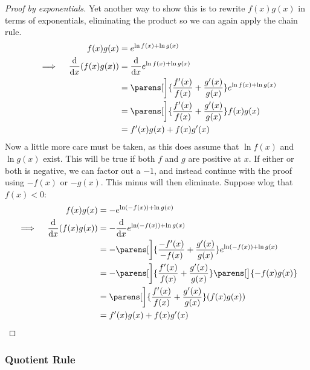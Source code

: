 \begin{proof}[Proof by exponentials]
    Yet another way to show this is to rewrite \(f(x)g(x)\) in terms of
    exponentials, eliminating the product so we can again apply the chain rule.
    \begin{alignat*}{2}
        && f(x)g(x) &= e^{\ln f(x) + \ln g(x)} \\
        &\implies{}& \dv{x} (f(x)g(x))
                    &= \dv{x} e^{\ln f(x) + \ln g(x)} \\
        &&          &= \parens[\bigg]{\frac{f'(x)}{f(x)} + \frac{g'(x)}{g(x)}}
                         e^{\ln f(x) + \ln g(x)} \\
        &&          &= \parens[\bigg]{\frac{f'(x)}{f(x)} + \frac{g'(x)}{g(x)}}
                         f(x)g(x) \\
        &&          &= f'(x)g(x) + f(x)g'(x)
    \end{alignat*}
    Now a little more care must be taken, as this does assume that \(\ln f(x)\)
    and \(\ln g(x)\) exist. This will be true if both \(f\) and \(g\) are
    positive at \(x\). If either or both is negative, we can factor out a
    \(-1\), and instead continue with the proof using \(-f(x)\) or \(-g(x)\).
    This minus will then eliminate. Suppose wlog that \(f(x) < 0\):
    \begin{alignat*}{2}
        && f(x)g(x) &= -e^{\ln(-f(x)) + \ln g(x)} \\
        &\implies{}& \dv{x} (f(x)g(x))
                    &= -\dv{x} e^{\ln(-f(x)) + \ln g(x)} \\
        &&          &= -\parens[\bigg]{\frac{-f'(x)}{-f(x)}
                                     + \frac{g'(x)}{g(x)}}
                         e^{\ln(-f(x)) + \ln g(x)} \\
        &&          &= -\parens[\bigg]{\frac{f'(x)}{f(x)} + \frac{g'(x)}{g(x)}}
                         \parens[\big]{-f(x)g(x)} \\
        &&          &= \parens[\bigg]{\frac{f'(x)}{f(x)} + \frac{g'(x)}{g(x)}}
                         (f(x)g(x)) \\
        &&          &= f'(x)g(x) + f(x)g'(x) \qedhere
    \end{alignat*}
\end{proof}

\subsubsection{Quotient Rule} \label{sec_calc_quotient}

